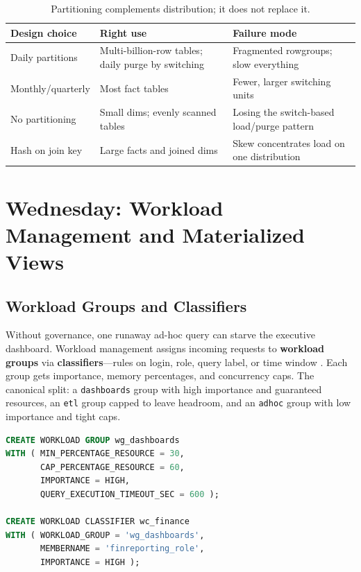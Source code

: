 \begin{table}[H]
\centering
\small
\begin{tabular}{@{}p{3.4cm}p{4.6cm}p{5.6cm}@{}}
\toprule
\textbf{Design choice} & \textbf{Right use} & \textbf{Failure mode} \\
\midrule
Daily partitions & Multi-billion-row tables; daily purge by switching & Fragmented rowgroups; slow everything \\
Monthly/quarterly & Most fact tables & Fewer, larger switching units \\
No partitioning & Small dims; evenly scanned tables & Losing the switch-based load/purge pattern \\
Hash on join key & Large facts and joined dims & Skew concentrates load on one distribution \\
\bottomrule
\end{tabular}
\caption{Partitioning complements distribution; it does not replace it.}
\label{tab:ch6-partitioning}
\end{table}

\section{Wednesday: Workload Management and Materialized Views}

\subsection{Workload Groups and Classifiers}
Without governance, one runaway ad-hoc query can starve the executive dashboard. Workload management assigns incoming requests to \textbf{workload groups} via \textbf{classifiers}---rules on login, role, query label, or time window \cite{microsoft2025synapseWorkloadMgmt}. Each group gets importance, memory percentages, and concurrency caps. The canonical split: a \texttt{dashboards} group with high importance and guaranteed resources, an \texttt{etl} group capped to leave headroom, and an \texttt{adhoc} group with low importance and tight caps.

\begin{lstlisting}[language=SQL,caption={Workload group and classifier: pin finance dashboards above ad-hoc queries.},label={lst:ch6-workload}]
CREATE WORKLOAD GROUP wg_dashboards
WITH ( MIN_PERCENTAGE_RESOURCE = 30,
       CAP_PERCENTAGE_RESOURCE = 60,
       IMPORTANCE = HIGH,
       QUERY_EXECUTION_TIMEOUT_SEC = 600 );

CREATE WORKLOAD CLASSIFIER wc_finance
WITH ( WORKLOAD_GROUP = 'wg_dashboards',
       MEMBERNAME = 'finreporting_role',
       IMPORTANCE = HIGH );
\end{lstlisting}

